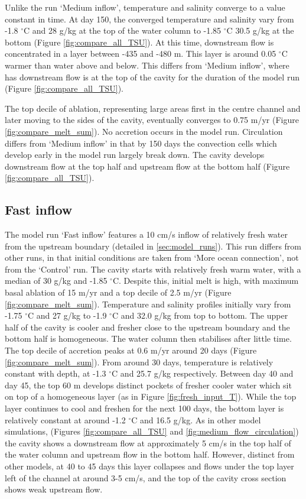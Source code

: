 Unlike the run `Medium inflow', temperature and salinity converge to a value constant in time. At day 150, the converged temperature and salinity vary from -1.8 $^{\circ}$C and 28  g/kg at the top of the water column to -1.85 $^{\circ}$C 30.5  g/kg at the bottom (Figure \ref{fig:compare_all_TSU}). At this time, downstream flow is concentrated in a layer between -435 and -480 m. This layer is around 0.05 $^{\circ}$C warmer than water above and below. This differs from `Medium inflow', where has downstream flow is at the top of the cavity for the duration of the model run (Figure \ref{fig:compare_all_TSU}). 

The top decile of ablation, representing large areas first in the centre channel and later moving to the sides of the cavity, eventually converges to 0.75 m/yr (Figure \ref{fig:compare_melt_sum}). No accretion occurs in the model run.
Circulation differs from `Medium inflow' in that by 150 days the convection cells which develop early in the model run largely break down. The cavity develops downstream flow at the top half and upstream flow at the bottom half (Figure \ref{fig:compare_all_TSU}).

\subsection{Fast inflow} \label{sec:high_velocity}

The model run `Fast inflow' features a 10 cm/s inflow of relatively fresh water from the upstream boundary (detailed in \ref{sec:model_runs}). This run differs from other runs, in that initial conditions are taken from `More ocean connection', not from the `Control' run. The cavity starts with relatively fresh warm water, with a median of 30  g/kg and -1.85 $^{\circ}$C.  Despite this, initial melt is high, with maximum basal ablation of 15 m/yr and a top decile of 2.5 m/yr (Figure \ref{fig:compare_melt_sum}).  Temperature and salinity profiles initially vary from -1.75 $^{\circ}$C and 27  g/kg to -1.9 $^{\circ}$C and 32.0  g/kg from top to bottom. The upper half of the cavity is cooler and fresher close to the upstream boundary and the bottom half is homogeneous. The water column then stabilises after little time. The top decile of accretion peaks at 0.6 m/yr around 20 days (Figure \ref{fig:compare_melt_sum}). From around 30 days, temperature is relatively constant with depth, at -1.3 $^{\circ}$C and 25.7  g/kg respectively.  Between day 40 and day 45, the top 60 m develops distinct pockets of fresher cooler water which sit on top of a homogeneous layer (as in Figure \ref{fig:fresh_input_T}). While the top layer continues to cool and freshen for the next 100 days, the bottom layer is relatively constant at around -1.2 $^{\circ}$C and 16.5 g/kg. As in other model simulations, (Figures \ref{fig:compare_all_TSU} and \ref{fig:medium_flow_circulation})  the cavity shows a  downstream flow at approximately 5 cm/s in the top half of the water column and upstream flow in the bottom half. However, distinct from other models, at 40 to 45 days this layer collapses and flows under the top layer left of the channel at around 3-5 cm/s, and the top of the cavity cross section shows weak upstream flow.  

